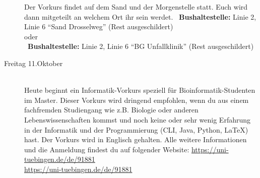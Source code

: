 \begin{description}
	\ifsommersemester
	\fi
	Der Vorkurs findet auf dem Sand und der Morgenstelle statt. Euch wird dann mitgeteilt an welchem Ort ihr sein werdet.
	~\textbf{Bushaltestelle:} Linie 2, Linie 6 "`Sand Drosselweg"' (Rest ausgeschildert)\\
	oder \\
	~\textbf{Bushaltestelle:} Linie 2, Linie 6 "`BG Unfallklinik"' (Rest ausgeschildert)
    \fi
\fi


\ifmaster
    \ifbinfo
        \item[Freitag 11.Oktober \YEAR]\ \\
            Heute beginnt ein Informatik-Vorkurs speziell für Bioinformatik-Studenten im Master. Dieser Vorkurs wird dringend empfohlen, wenn du aus einem fachfremden Studiengang wie z.B. Biologie oder anderen Lebenswissenschaften kommst und noch keine oder sehr wenig Erfahrung in der Informatik und der Programmierung (CLI, Java, Python, \LaTeX) hast. Der Vorkurs wird in Englisch gehalten. Alle weitere Informationen und die Anmeldung findest du auf folgender Website: \url{https://uni-tuebingen.de/de/91881} \\
            \url{https://uni-tuebingen.de/de/91881}


\end{description}
